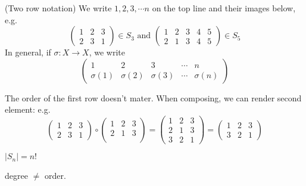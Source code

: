 \documentclass[a4paper]{article}
\begin{document}
  \begin{notation}
    (Two row notation) We write $1, 2, 3, \cdots n$ on the top line and their images below, e.g.
    \[
      \begin{pmatrix}
        1 & 2 & 3\\
        2 & 3 & 1
      \end{pmatrix}\in S_3 \text{ and }
      \begin{pmatrix}
        1 & 2 & 3 & 4 & 5\\
        2 & 1 & 3 & 4 & 5
      \end{pmatrix}\in S_5
    \]
    In general, if $\sigma: X\to X$, we write
    \[
      \begin{pmatrix}
        1 & 2 & 3 &\cdots& n\\
        \sigma(1) & \sigma(2)&\sigma(3) &\cdots& \sigma{(n)}
      \end{pmatrix}
    \]
    \begin{note}
      The order of the first row doesn't mater. When composing, we can render second element: e.g. 
      \[
        \begin{pmatrix}
          1 & 2 & 3\\
          2 & 3 & 1
        \end{pmatrix}
        \circ
        \begin{pmatrix}
          1 & 2 & 3\\
          2 & 1 & 3\\
        \end{pmatrix}
        =
        \begin{pmatrix}
          1 & 2 & 3\\
          2 & 1 & 3\\
          3 & 2 & 1
        \end{pmatrix}
        = 
        \begin{pmatrix}
          1 & 2 & 3\\
          3 & 2 & 1
        \end{pmatrix}
      \]
    \end{note}
  \end{notation}
  \begin{prop}
    $|S_n| = n!$
  \end{prop}
  \note degree $\not=$ order.
\end{document}
